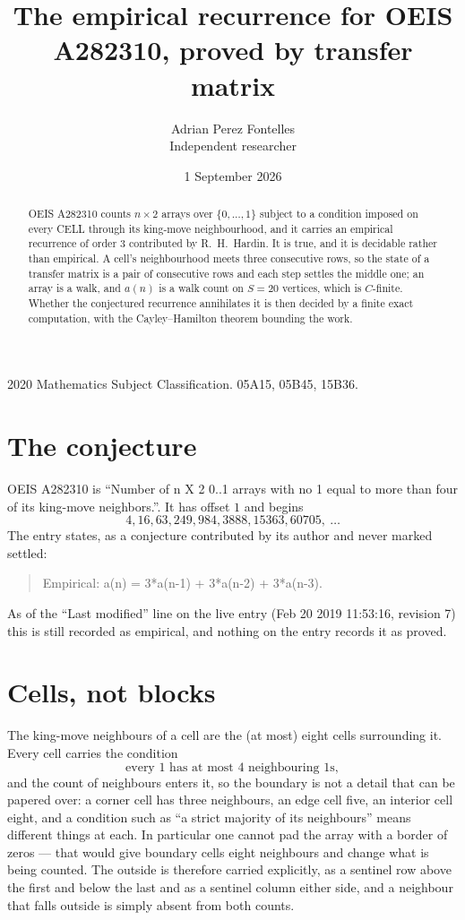 \documentclass[11pt,a4paper]{article}
\title{The empirical recurrence for OEIS A282310, proved by transfer matrix}
\author{Adrian Perez Fontelles\\ \small Independent researcher}
\date{1 September 2026}
\theoremstyle{plain}
\theoremstyle{definition}
\begin{document}
\maketitle

\begin{abstract}
OEIS A282310 counts $n\times2$ arrays over $\{0,\dots,1\}$ subject to a condition imposed on
every CELL through its king-move neighbourhood, and it carries an empirical recurrence of
order $3$ contributed by R.~H.~Hardin. It is true, and it is decidable rather than
empirical. A cell's neighbourhood meets three consecutive rows, so the state of a transfer
matrix is a pair of consecutive rows and each step settles the middle one; an array is a
walk, and $a(n)$ is a walk count on $S=20$ vertices, which is $C$-finite. Whether the
conjectured recurrence annihilates it is then decided by a finite exact computation, with the
Cayley--Hamilton theorem bounding the work.
\end{abstract}

\noindent\small 2020 Mathematics Subject Classification. 05A15, 05B45, 15B36.\normalsize

\section{The conjecture}

OEIS A282310 is ``Number of n X 2 0..1 arrays with no 1 equal to more than four of its king-move neighbors.''. It has offset $1$ and begins
\[
4, 16, 63, 249, 984, 3888, 15363, 60705,\ \dots
\]
The entry states, as a conjecture contributed by its author and never marked settled:
\begin{quote}
Empirical: a(n) = 3*a(n-1) + 3*a(n-2) + 3*a(n-3).
\end{quote}
As of the ``Last modified'' line on the live entry (Feb 20 2019 11:53:16, revision 7) this is still
recorded as empirical, and nothing on the entry records it as proved.

\section{Cells, not blocks}

The king-move neighbours of a cell are the (at most) eight cells surrounding it. Every cell
carries the condition
\[
\text{every }1\text{ has at most }4\text{ neighbouring }1\text{s},
\]
and the count of neighbours enters it, so the boundary is not a detail that can be papered
over: a corner cell has three neighbours, an edge cell five, an interior cell eight, and a
condition such as ``a strict majority of its neighbours'' means different things at each. In
particular one cannot pad the array with a border of zeros --- that would give boundary cells
eight neighbours and change what is being counted. The outside is therefore carried
explicitly, as a sentinel row above the first and below the last and as a sentinel column
either side, and a neighbour that falls outside is simply absent from both counts.
\end{document}

